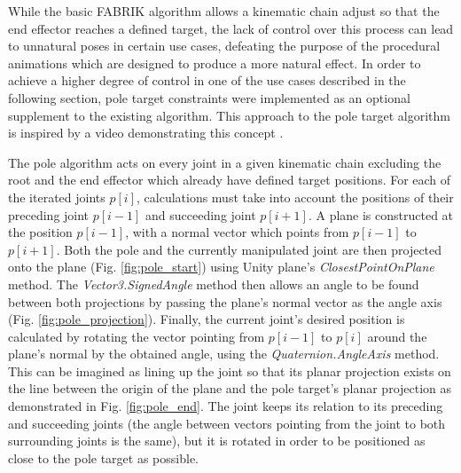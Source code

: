 While the basic FABRIK algorithm allows a kinematic chain adjust so that the end
effector reaches a defined target, the lack of control over this process can
lead to unnatural poses in certain use cases, defeating the purpose of the
procedural animations which are designed to produce a more natural effect. In
order to achieve a higher degree of control in one of the use cases described in
the following section, pole target constraints were implemented as an optional
supplement to the existing algorithm. This approach to the pole target algorithm
is inspired by a video demonstrating this concept \cite{youtube_ik}. 

The pole algorithm acts on every joint in a given kinematic chain excluding the
root and the end effector which already have defined target positions. For each
of the iterated joints \(p[i]\), calculations must take into account the
positions of their preceding joint \(p[i-1]\) and succeeding joint \(p[i+1]\).
A plane is constructed at the position \(p[i-1]\), with a normal vector which
points from \(p[i-1]\) to \(p[i+1]\). Both the pole and the currently
manipulated joint are then projected onto the plane (Fig.
\ref{fig:pole_start}) using Unity plane's \textit{ClosestPointOnPlane} method.
The \textit{Vector3.SignedAngle} method then allows an angle to be found between
both projections by passing the plane's normal vector as the angle axis (Fig.
\ref{fig:pole_projection}). Finally, the current joint's desired position is
calculated by rotating the vector pointing from \(p[i-1]\) to \(p[i]\) around
the plane's normal by the obtained angle, using the
\textit{Quaternion.AngleAxis} method. This can be imagined as lining up the
joint so that its planar projection exists on the line between the origin of the
plane and the pole target's planar projection as demonstrated in Fig.
\ref{fig:pole_end}. The joint keeps its relation to its preceding and succeeding
joints (the angle between vectors pointing from the joint to both surrounding
joints is the same), but it is rotated in order to be positioned as close to the
pole target as possible.

